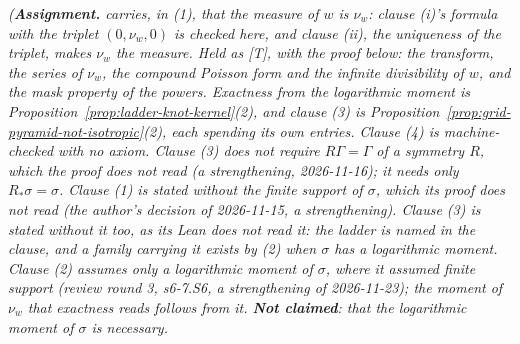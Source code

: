 \begin{proposition}[the resolvent masks are exact]
\statusA\quad{}\quad\emph{(\textbf{Assignment.}  carries, in (1), that the
\Levy{} measure of $w$ is $\nu_w$: clause (i)'s formula with the triplet $(0, \nu_w, 0)$ is checked
here, and clause (ii), the uniqueness of the triplet, makes $\nu_w$ the \Levy{} measure. Held as
[T], with the proof below: the transform, the series of $\nu_w$, the compound Poisson form and the
infinite divisibility of $w$, and the mask property of the powers. Exactness from the logarithmic
moment is Proposition~\ref{prop:ladder-knot-kernel}(2), and clause (3) is
Proposition~\ref{prop:grid-pyramid-not-isotropic}(2), each spending its own entries. Clause (4) is
machine-checked with no axiom.
Clause (3) does not require $R\Gamma = \Gamma$ of a symmetry $R$, which the proof does not read (a
strengthening, 2026-11-16); it needs only $R_*\sigma = \sigma$. Clause
(1) is stated without the finite support of $\sigma$, which its proof does not read (the author's
decision of 2026-11-15, a strengthening).
Clause (3) is stated without it too, as its Lean does not read it: the ladder is named in the
clause, and a family carrying it exists by (2) when $\sigma$ has a logarithmic moment.
Clause (2) assumes only a logarithmic moment of $\sigma$, where it assumed finite support (review
round 3, s6-7.S6, a strengthening of 2026-11-23); the moment of $\nu_w$ that exactness reads
follows from it. \textbf{Not claimed}: that the logarithmic moment of $\sigma$ is necessary.
}
\end{proposition}
